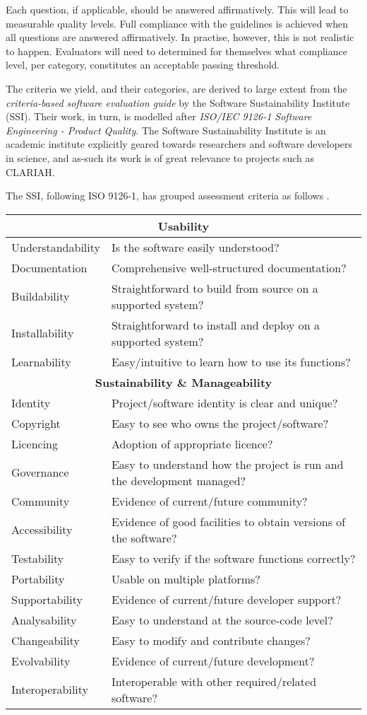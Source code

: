 \documentclass[a4paper,11pt]{article}
\begin{document}
Each question, if applicable, should be answered affirmatively. This will lead
to measurable quality levels. Full compliance with the guidelines is achieved
when all questions are answered affirmatively. In practise, however, this is
not realistic to happen. Evaluators will need to determined for themselves what
compliance level, per category, constitutes an acceptable passing threshold.

The criteria we yield, and their categories, are derived to large extent from
the \emph{criteria-based software evaluation guide} \cite{SSIGUIDE} by the Software
Sustainability Institute (SSI). Their work, in turn, is modelled after \emph{ISO/IEC
9126-1 Software Engineering - Product Quality}.  The Software
Sustainability Institute is an academic institute explicitly geared towards
researchers and software developers in science, and as-such its work is of
great relevance to projects such as CLARIAH. 

The SSI, following ISO 9126-1, has grouped assessment criteria as follows
\cite{SSIGUIDE}.

\begin{tabular}{l|l}
\hline
\multicolumn{2}{c}{\textbf{Usability}} \\
\hline
Understandability & Is the software easily understood? \\ 
Documentation & Comprehensive well-structured documentation? \\
Buildability  & Straightforward to build from source on a supported system? \\
Installability  & Straightforward to install and deploy on a supported system? \\
Learnability & Easy/intuitive to learn how to use its functions? \\
\hline
\multicolumn{2}{c}{\textbf{Sustainability \& Manageability}} \\
\hline
Identity & Project/software identity is clear and unique? \\
Copyright & Easy to see who owns the project/software? \\
Licencing & Adoption of appropriate licence? \\
Governance & Easy to understand how the project is run and the development managed? \\
Community & Evidence of current/future community? \\
Accessibility & Evidence of good facilities to obtain versions of the software? \\
Testability & Easy to verify if the software functions correctly? \\
Portability & Usable on multiple platforms? \\
Supportability & Evidence of current/future developer support? \\
Analysability & Easy to understand at the source-code level? \\
Changeability & Easy to modify and contribute changes? \\
Evolvability & Evidence of current/future development? \\
Interoperability & Interoperable with other required/related software? \\
\end{tabular}
\end{document}
